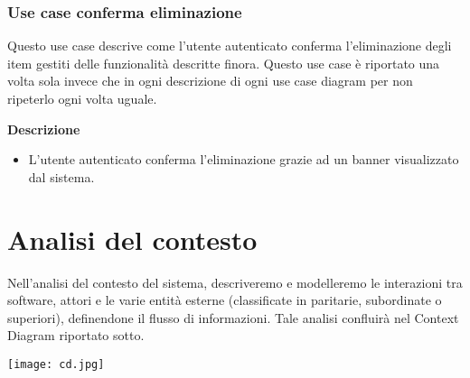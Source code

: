 \documentclass[a4paper,12pt]{article}
\begin{document}
\subsubsection*{Use case conferma eliminazione}

 Questo use case descrive come l'utente autenticato conferma l'eliminazione degli item gestiti delle funzionalità descritte finora.
 Questo use case è riportato una volta sola invece che in ogni descrizione di ogni use case diagram per non ripeterlo ogni volta uguale. 
 
\textbf{Descrizione}
\begin{itemize} \setlength\itemsep{0.01em}
\item L'utente autenticato conferma l'eliminazione grazie ad un banner visualizzato dal sistema.
\end{itemize}





\section*{Analisi del contesto}
Nell'analisi del contesto del sistema, descriveremo e modelleremo le interazioni tra software, attori e le varie entità esterne (classificate in paritarie, subordinate o superiori), definendone il flusso di informazioni. Tale analisi confluirà nel Context Diagram riportato sotto.

\begin{center}
  \texttt{[image: cd.jpg]}
\end{center}
\end{document}
